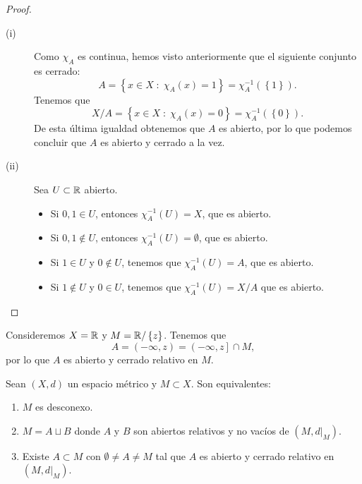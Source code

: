 \begin{proof}
\begin{description}
\item[(i)] Como $\displaystyle \chi_{A} $ es continua, hemos visto anteriormente que el siguiente conjunto es cerrado:
	\[A = \left\{ x \in X \; : \; \chi_{A}\left(x\right) = 1\right\}  = \chi_{A}^{-1}\left( \left\{ 1\right\} \right) .\]
	Tenemos que 
	\[X/A = \left\{ x \in X \; : \; \chi_{A}\left(x\right) = 0\right\}  = \chi_{A}^{-1}\left( \left\{ 0\right\} \right) .\]
	De esta última igualdad obtenemos que $\displaystyle A $ es abierto, por lo que podemos concluir que $\displaystyle A $ es abierto y cerrado a la vez. 
\item[(ii)] Sea $\displaystyle U \subset \mathbb{R} $ abierto. 
	\begin{itemize}
	\item Si $\displaystyle 0,1 \in U $, entonces $\displaystyle \chi_{A}^{-1}\left(U\right) = X $, que es abierto. 
	\item Si $\displaystyle 0,1 \not\in U $, entonces $\displaystyle \chi_{A}^{-1}\left(U\right) = \emptyset $, que es abierto.
	\item Si $\displaystyle 1 \in U $ y $\displaystyle 0 \not\in U $, tenemos que $\displaystyle \chi_{A}^{-1}\left(U\right) = A $, que es abierto.
	\item Si $\displaystyle 1 \not\in U $ y $\displaystyle 0 \in U $, tenemos que $\displaystyle \chi_{A}^{-1}\left(U\right) = X / A $ que es abierto. 
	\end{itemize}
\end{description}
\end{proof}
\begin{eg}
	Consideremos $\displaystyle X = \mathbb{R} $ y $\displaystyle M = \mathbb{R}/ \left\{ z\right\}  $. Tenemos que 
	\[ A =\left(-\infty, z\right) = \left(-\infty,z\right] \cap M ,\]
	por lo que $\displaystyle A $ es abierto y cerrado relativo en $\displaystyle M $. 
\end{eg}
\begin{theorem}
Sean $\displaystyle \left(X,d\right) $ un espacio métrico y $\displaystyle M \subset X $. Son equivalentes:
\begin{enumerate}
\item $\displaystyle M $ es desconexo.
\item $\displaystyle M = A \sqcup B $ donde $\displaystyle A $ y $\displaystyle B $ son abiertos relativos y no vacíos de $\displaystyle \left(M, d|_{M}\right) $. 
\item Existe $\displaystyle A \subset M $ con $\displaystyle \emptyset \neq A \neq M $ tal que $\displaystyle A $ es abierto y cerrado relativo en $\displaystyle \left(M, d|_{M}\right) $. 
\end{enumerate}
\end{theorem}
